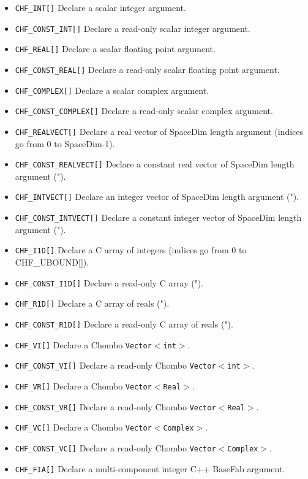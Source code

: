 \begin{itemize}
\item {\tt CHF\_INT[\argv]} Declare a scalar integer argument.
\item {\tt CHF\_CONST\_INT[\argv]} Declare a read-only scalar integer argument.
\item {\tt CHF\_REAL[\argv]} Declare a scalar floating point argument.
\item {\tt CHF\_CONST\_REAL[\argv]} Declare a read-only scalar floating point argument.
\item {\tt CHF\_COMPLEX[\argv]} Declare a scalar complex argument.
\item {\tt CHF\_CONST\_COMPLEX[\argv]} Declare a read-only scalar complex argument.
\item {\tt CHF\_REALVECT[\argv]} Declare a real vector of SpaceDim length argument (indices go from 0 to SpaceDim-1).
\item {\tt CHF\_CONST\_REALVECT[\argv]} Declare a constant real vector of SpaceDim length argument ("). 
\item {\tt CHF\_INTVECT[\argv]} Declare an integer vector of SpaceDim length argument (").
\item {\tt CHF\_CONST\_INTVECT[\argv]} Declare a constant integer vector of SpaceDim length argument (").
\item {\tt CHF\_I1D[\argv]} Declare a C array of integers (indices go from 0 to CHF\_UBOUND[\argv]).
\item {\tt CHF\_CONST\_I1D[\argv]} Declare a read-only C array (").
\item {\tt CHF\_R1D[\argv]} Declare a C array of reals (").
\item {\tt CHF\_CONST\_R1D[\argv]} Declare a read-only C array of reals (").
\item {\tt CHF\_VI[\argv]} Declare a Chombo {\tt Vector$<$int$>$}.
\item {\tt CHF\_CONST\_VI[\argv]} Declare a read-only Chombo {\tt Vector$<$int$>$}.
\item {\tt CHF\_VR[\argv]} Declare a Chombo {\tt Vector$<$Real$>$}.
\item {\tt CHF\_CONST\_VR[\argv]} Declare a read-only Chombo {\tt Vector$<$Real$>$}.
\item {\tt CHF\_VC[\argv]} Declare a Chombo {\tt Vector$<$Complex$>$}.
\item {\tt CHF\_CONST\_VC[\argv]} Declare a read-only Chombo {\tt Vector$<$Complex$>$}.
\item {\tt CHF\_FIA[\argv]} Declare a multi-component integer C++ BaseFab argument.

\end{itemize}
